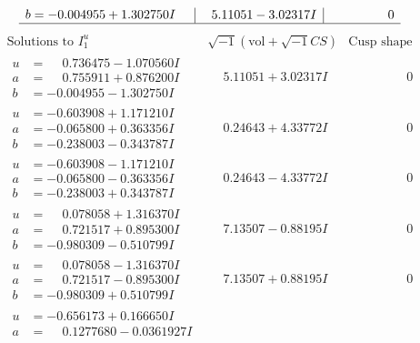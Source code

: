 \documentclass[1p]{elsarticle_modified}
\theoremstyle{definition}
\newcommand{\I}{\sqrt{-1}}
\begin{document}
$$\begin{array}{c|c|c}
\begin{aligned}
b &= -0.004955 + 1.302750 I\end{aligned}
 & \phantom{-}5.11051 - 3.02317 I & \phantom{-0.000000 } 0\\
 \hline 
 \end{array}$$\newpage$$\begin{array}{c|c|c}  
\text{Solutions to }I^u_{1}& \I (\text{vol} + \sqrt{-1}CS) & \text{Cusp shape}\\
 \hline 
\begin{aligned}
u &= \phantom{-}0.736475 - 1.070560 I \\
a &= \phantom{-}0.755911 + 0.876200 I \\
b &= -0.004955 - 1.302750 I\end{aligned}
 & \phantom{-}5.11051 + 3.02317 I & \phantom{-0.000000 } 0 \\ \hline\begin{aligned}
u &= -0.603908 + 1.171210 I \\
a &= -0.065800 + 0.363356 I \\
b &= -0.238003 - 0.343787 I\end{aligned}
 & \phantom{-}0.24643 + 4.33772 I & \phantom{-0.000000 } 0 \\ \hline\begin{aligned}
u &= -0.603908 - 1.171210 I \\
a &= -0.065800 - 0.363356 I \\
b &= -0.238003 + 0.343787 I\end{aligned}
 & \phantom{-}0.24643 - 4.33772 I & \phantom{-0.000000 } 0 \\ \hline\begin{aligned}
u &= \phantom{-}0.078058 + 1.316370 I \\
a &= \phantom{-}0.721517 + 0.895300 I \\
b &= -0.980309 - 0.510799 I\end{aligned}
 & \phantom{-}7.13507 - 0.88195 I & \phantom{-0.000000 } 0 \\ \hline\begin{aligned}
u &= \phantom{-}0.078058 - 1.316370 I \\
a &= \phantom{-}0.721517 - 0.895300 I \\
b &= -0.980309 + 0.510799 I\end{aligned}
 & \phantom{-}7.13507 + 0.88195 I & \phantom{-0.000000 } 0 \\ \hline\begin{aligned}
u &= -0.656173 + 0.166650 I \\
a &= \phantom{-}0.1277680 - 0.0361927 I \\

\end{aligned}
\end{array}$$
\end{document}
